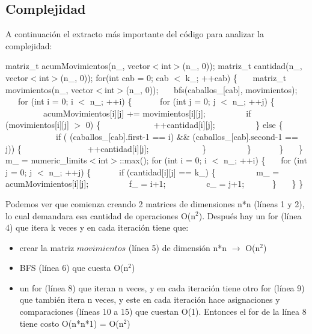 \newpage
\subsection{Complejidad}

A continuación el extracto más importante del código para analizar la complejidad: 

\begin{codebox}
\li matriz\_t acumMovimientos(n\_, vector$<$int$>$(n\_, 0)); 	
\li	matriz\_t cantidad(n\_, vector$<$int$>$(n\_, 0));			
\li	
\li	for(int cab = 0; cab $<$ k\_; ++cab) \{						
\li \ \ \		matriz\_t movimientos(n\_, vector$<$int$>$(n\_, 0));	
\li	\ \ \		bfs(caballos\_[cab], movimientos);				
\li
\li	\ \ \		for (int i = 0; i $<$ n\_; ++i) \{				
\li	\ \ \ \ \ \		for (int j = 0; j $<$ n\_; ++j) \{			
\li	\ \ \ \ \ \ \ \ \		acumMovimientos[i][j] += movimientos[i][j];	
\li	\ \ \ \ \ \ \ \ \		if (movimientos[i][j] $>$ 0) \{		
\li	\ \ \ \ \ \ \ \ \ \ \ \			++cantidad[i][j];			
\li	\ \ \ \ \ \ \ \ \		\} else \{
\li	\ \ \ \ \ \ \ \ \ \ \ \		if ( (caballos\_[cab].first-1 == i) \&\& (caballos\_[cab].second-1 == j)) \{								
\li	\ \ \ \ \ \ \ \ \ \ \ \ \ \ \		++cantidad[i][j];		
\li	\ \ \ \ \ \ \ \ \ \ \ \		\}
\li	\ \ \ \ \ \ \ \ \		\}
\li	\ \ \ \ \ \			\}
\li	\ \ \			\}
\li
\li	m\_ = numeric\_limits$<$int$>$::max();						
\li	for (int i = 0; i $<$ n\_; ++i) \{							
\li \ \ \	for (int j = 0; j $<$ n\_; ++j) \{					
\li	\ \ \ \ \ \	if (cantidad[i][j] == k\_) \{					
\li	\ \ \ \ \ \ \ \ \	m\_ = acumMovimientos[i][j];			
\li	\ \ \ \ \ \ \ \ \	f\_ = i+1;								
\li	\ \ \ \ \ \ \ \ \	c\_ = j+1;								
\li	\ \ \ \ \ \ 	\}
\li \ \ \		\}
\li			\}
\end{codebox}


Podemos ver que comienza creando 2 matrices de dimensiones n*n (líneas 1 y 2), lo cual demandara esa cantidad de operaciones O(n$^{2}$). Después hay un for (línea 4) que itera k veces y en cada iteración tiene que:

 \begin{itemize}
 \item	crear la matriz $movimientos$ (línea 5) de dimensión n*n $\rightarrow$ O(n$^{2}$)
 \item  BFS (línea 6) que cuesta O(n$^{2}$)
 \item  un for (línea 8) que iteran n veces, y en cada iteración tiene otro for (línea 9) que también itera n veces, y este en cada iteración hace asignaciones y comparaciones (líneas 10 a 15) que cuestan O(1). Entonces el for de la línea 8 tiene costo O(n*n*1) = O(n$^{2}$)
 \end{itemize}
 

